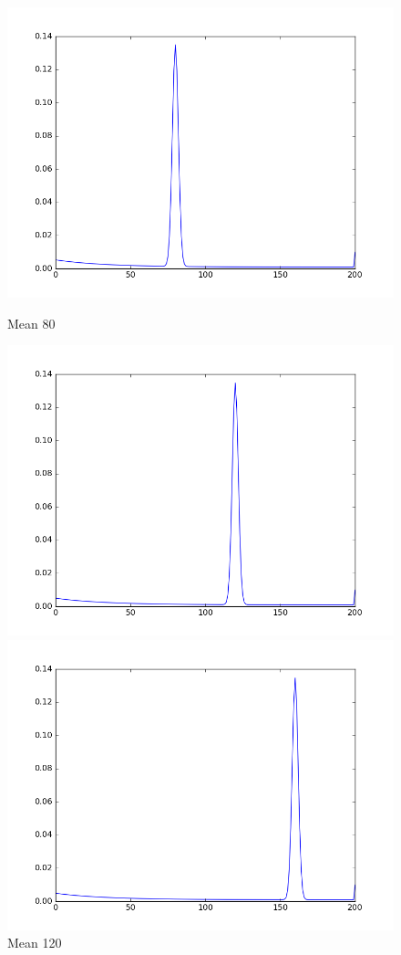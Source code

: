 \documentclass{article}
\begin{document}
\begin{figure}[!hb]
\begin{minipage}[b]{0.4\textwidth}
  \includegraphics[width=\textwidth]{sensor_model_5.png}
  \caption{Mean 80}
 \end{minipage}
 \hfill
 \begin{minipage}[b]{0.4\textwidth}
  \includegraphics[width=\textwidth]{sensor_model_7.png}
  \caption{Mean 120}
 \end{minipage}
 \vfill
 \begin{minipage}[b]{0.4\textwidth}
  \includegraphics[width=\textwidth]{sensor_model_9.png}

\end{minipage}
\end{figure}
\end{document}
